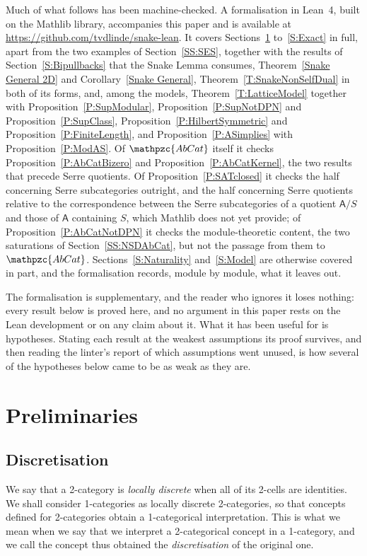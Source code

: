 \documentclass[reqno,a4paper]{amsart}
\numberwithin{equation}{section}
\theoremstyle{plain}
\theoremstyle{definition}
\def\nameit#1{\textrm{#1}~}
\def\thex{\nameit{Theorem}}
\def\prox{\nameit{Proposition}}
\def\corx{\nameit{Corollary}}
\def\dfn#1{{\itshape #1}}
\newcommand{\catfont}[1]{\ensuremath{\mathpzc{#1}}\xspace}
\newcommand{\onecat}[1]{\ensuremath{\mathsf{#1}}\xspace}
\newcommand{\AbCat}{\catfont{AbCat}}
\renewcommand{\1}{\onecat{1}}
\begin{document}
Much of what follows has been machine-checked. A formalisation in Lean~4, built on the Mathlib library, accompanies this paper and is available at \url{https://github.com/tvdlinde/snake-lean}. It covers Sections~\ref{S:Preliminaries} to~\ref{S:Exact} in full, apart from the two examples of Section~\ref{SS:SES}, together with the results of Section~\ref{S:Bipullbacks} that the Snake Lemma consumes, \thex\ref{Snake General 2D} and \corx\ref{Snake General}, \thex\ref{T:SnakeNonSelfDual} in both of its forms, and, among the models, \thex\ref{T:LatticeModel} together with \prox\ref{P:SupModular}, \prox\ref{P:SupNotDPN} and \prox\ref{P:SupClass}, \prox\ref{P:HilbertSymmetric} and \prox\ref{P:FiniteLength}, and \prox\ref{P:ASimplies} with \prox\ref{P:ModAS}. Of \(\AbCat\) itself it checks \prox\ref{P:AbCatBizero} and \prox\ref{P:AbCatKernel}, the two results that precede Serre quotients. Of \prox\ref{P:SATclosed} it checks the half concerning Serre subcategories outright, and the half concerning Serre quotients relative to the correspondence between the Serre subcategories of a quotient \(\onecat{A}/S\) and those of \(\onecat{A}\) containing \(S\), which Mathlib does not yet provide; of \prox\ref{P:AbCatNotDPN} it checks the module-theoretic content, the two saturations of Section~\ref{SS:NSDAbCat}, but not the passage from them to \(\AbCat\). Sections~\ref{S:Naturality} and~\ref{S:Model} are otherwise covered in part, and the formalisation records, module by module, what it leaves out.

The formalisation is supplementary, and the reader who ignores it loses nothing: every result below is proved here, and no argument in this paper rests on the Lean development or on any claim about it. What it has been useful for is hypotheses. Stating each result at the weakest assumptions its proof survives, and then reading the linter's report of which assumptions went unused, is how several of the hypotheses below came to be as weak as they are.


\section{Preliminaries}\label{S:Preliminaries}

\subsection{Discretisation}\label{SS:Discretisation}

We say that a 2-category is \dfn{locally discrete} when all of its 2-cells are identities. We shall consider 1-categories as locally discrete 2-categories, so that concepts defined for 2-categories obtain a 1-categorical interpretation. This is what we mean when we say that we interpret a 2-categorical concept in a 1-category, and we call the concept thus obtained the \dfn{discretisation} of the original one.
\end{document}
